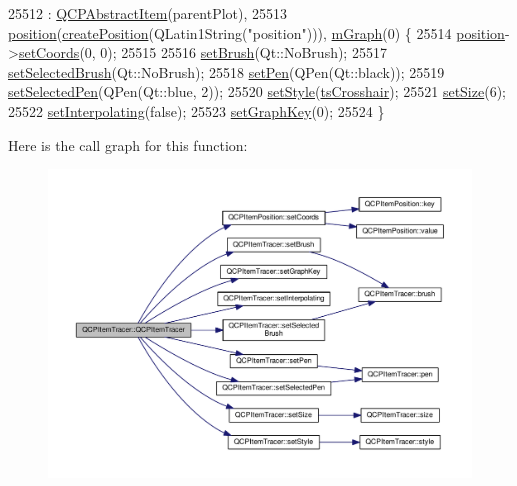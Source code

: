 \begin{DoxyCode}
25512     : \hyperlink{class_q_c_p_abstract_item_a9922507d8b4503a1fe1ed0b1030e23b6}{QCPAbstractItem}(parentPlot),
25513       \hyperlink{class_q_c_p_item_tracer_a69917e2fdb2b3a929c196958feee7cbe}{position}(\hyperlink{class_q_c_p_abstract_item_a75036d39c4d4e2e1a7dd145fff915d32}{createPosition}(QLatin1String(\textcolor{stringliteral}{"position"}))), 
      \hyperlink{class_q_c_p_item_tracer_a2d70cf616b579563aa15f796dfc143ac}{mGraph}(0) \{
25514   \hyperlink{class_q_c_p_item_tracer_a69917e2fdb2b3a929c196958feee7cbe}{position}->\hyperlink{class_q_c_p_item_position_aa988ba4e87ab684c9021017dcaba945f}{setCoords}(0, 0);
25515 
25516   \hyperlink{class_q_c_p_item_tracer_a2c303f7470a30084daa201ed556b3c36}{setBrush}(Qt::NoBrush);
25517   \hyperlink{class_q_c_p_item_tracer_a0f55c084980a7a312af859d3e7b558ef}{setSelectedBrush}(Qt::NoBrush);
25518   \hyperlink{class_q_c_p_item_tracer_af8048636fc1ef0152e51809b008df2ca}{setPen}(QPen(Qt::black));
25519   \hyperlink{class_q_c_p_item_tracer_ae1bf70db7f13f928660168cd3e5069f3}{setSelectedPen}(QPen(Qt::blue, 2));
25520   \hyperlink{class_q_c_p_item_tracer_a41a2ac4f1acd7897b4e2a2579c03204e}{setStyle}(\hyperlink{class_q_c_p_item_tracer_a2f05ddb13978036f902ca3ab47076500af562ec81ac3ba99e26ef8540cf1ec16f}{tsCrosshair});
25521   \hyperlink{class_q_c_p_item_tracer_ae47fe0617f5fef5fdb766999569be10a}{setSize}(6);
25522   \hyperlink{class_q_c_p_item_tracer_a6c244a9d1175bef12b50afafd4f5fcd2}{setInterpolating}(\textcolor{keyword}{false});
25523   \hyperlink{class_q_c_p_item_tracer_a6840143b42f3b685cedf7c6d83a704c8}{setGraphKey}(0);
25524 \}
\end{DoxyCode}


Here is the call graph for this function\+:\nopagebreak
\begin{figure}[H]
\begin{center}
\leavevmode
\includegraphics[width=350pt]{class_q_c_p_item_tracer_adc5ca846eeac323db4aa1fc4081e36be_cgraph}
\end{center}
\end{figure}


